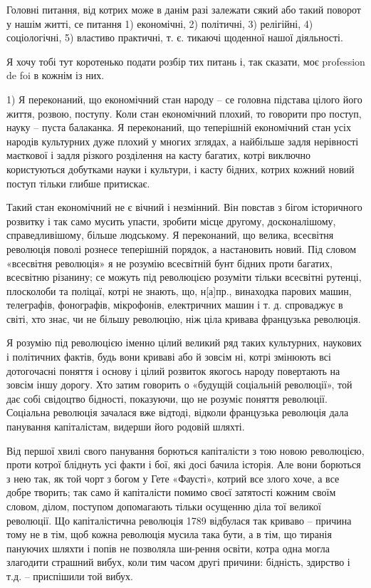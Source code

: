 Головні питання, від котрих може в данім разі залежати сякий або такий поворот у нашім житті, се питання 1) економічні, 2) політичні, 3) релігійні, 4) соціологічні, 5) властиво практичні, т. є. тикаючі щоденної нашої діяльності.

Я хочу тобі тут коротенько подати розбір тих питань і, так сказати, моє profession de foi в кожнім із них.

1) Я переконаний, що економічний стан народу – се головна підстава цілого його
життя, розвою, поступу. Коли стан економічний плохий, то говорити про поступ,
науку – пуста балаканка. Я переконаний, що теперішній економічний стан усіх
народів культурних дуже плохий у многих зглядах, а найбільше задля нерівності
маєткової і задля різкого розділення на касту багатих, котрі виключно
користуються добутками науки і культури, і касту бідних, котрих кожний новий
поступ тільки глибше притискає.

Такий стан економічний не є вічний і незмінний. Він повстав з бігом історичного
розвитку і так само мусить упасти, зробити місце другому, досконалішому,
справедливішому, більше людському. Я переконаний, що велика, всесвітня
революція поволі рознесе теперішній порядок, а настановить новий. Під словом
«всесвітня революція» я не розумію всесвітній бунт бідних проти багатих,
всесвітню різанину; се можуть під революцією розуміти тільки всесвітні рутенці,
плосколоби та поліцаї, котрі не знають, що, н[а]пр., винаходка парових машин,
телеграфів, фонографів, мікрофонів, електричних машин і т. д. спроваджує в
світі, хто знає, чи не більшу революцію, ніж ціла кривава французька революція.

Я розумію під революцією іменно цілий великий ряд таких культурних, наукових і
політичних фактів, будь вони криваві або й зовсім ні, котрі змінюють всі
дотогочасні поняття і основу і цілий розвиток якогось народу повертають на
зовсім іншу дорогу. Хто затим говорить о «будущій соціальній революції», той
дає собі свідоцтво бідності, показуючи, що не розуміє поняття революції.
Соціальна революція зачалася вже відтоді, відколи французька революція дала
панування капіталістам, видерши його родовій шляхті.

Від першої хвилі свого панування борються капіталісти з тою новою революцією,
проти котрої бліднуть усі факти і бої, які досі бачила історія. Але вони
борються з нею так, як той чорт з богом у Гете «Фаусті», котрий все злого хоче,
а все добре творить; так само й капіталісти помимо своєї затятості кожним своїм
словом, ділом, поступом допомагають тільки осущенню діла тої великої революції.
Що капіталістична революція 1789 відбулася так криваво – причина тому не в тім,
щоб кожна революція мусила така бути, а в тім, що тиранія пануючих шляхти і
попів не позволяла ши-рення освіти, котра одна могла злагодити страшний вибух,
коли тим часом другі причини: бідність, здирство і т.д. – приспішили той вибух.

